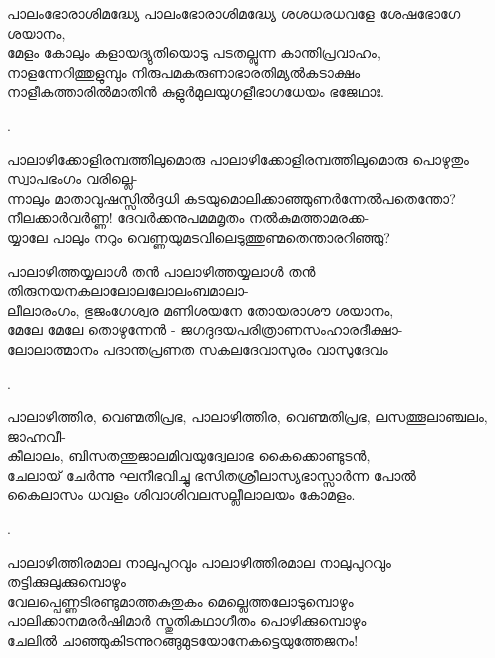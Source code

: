 \begin{enumerate}

\begin{slokam}{\VSr}{\Mazha}{പാലംഭോരാശിമദ്ധ്യേ}
 പാലംഭോരാശിമദ്ധ്യേ ശശധരധവളേ ശേഷഭോഗേ ശയാനം,\\
മേളം കോലും കളായദ്യുതിയൊടു പടതല്ലുന്ന കാന്തിപ്രവാഹം,\\
നാളന്നേറിത്തുളുമ്പും നിരുപമകരുണാഭാരതിമ്യൽകടാക്ഷം\\
നാളീകത്താരിൽമാതിൻ കുളുർമുലയുഗളീഭാഗധേയം ഭജേഥാഃ.
\end{slokam}


.


\begin{slokam}{\VSr}{\VKG}{പാലാഴിക്കോളിരമ്പത്തിലുമൊരു}
 പാലാഴിക്കോളിരമ്പത്തിലുമൊരു പൊഴുതും സ്വാപഭംഗം വരില്ലെ-\\
ന്നാലും മാതാവുഷസ്സിൽദ്ദധി കടയുമൊലിക്കാഞ്ഞുണർന്നേൽപതെന്തോ?\\
നീലക്കാർവർണ്ണ! ദേവർക്കനുപമമമൃതം നൽകുമത്താമരക്ക-\\
യ്യാലേ പാലും നറും വെണ്ണയുമടവിലെടുത്തുണ്മതെന്താരറിഞ്ഞു?
\end{slokam}


\begin{slokam}{\VSr}{\Punam}{പാലാഴിത്തയ്യലാള്‍ തൻ}
പാലാഴിത്തയ്യലാള്‍ തൻ തിരുനയനകലാലോലലോലംബമാലാ-\\
ലീലാരംഗം, ഭുജംഗേശ്വര മണിശയനേ തോയരാശൗ ശയാനം,\\
മേലേ മേലേ തൊഴുന്നേൻ - ജഗദുദയപരിത്രാണസംഹാരദീക്ഷാ-\\
ലോലാത്മാനം പദാന്തപ്രണത സകലദേവാസുരം വാസുദേവം
\end{slokam}


.

\begin{slokam}{\VSv}{\KJ}{പാലാഴിത്തിര, വെണ്മതിപ്രഭ,}
പാലാഴിത്തിര, വെണ്മതിപ്രഭ, ലസത്തൂലാഞ്ചലം, ജാഹ്നവീ-\\
കീലാലം, ബിസതന്തുജാലമിവയുദ്വേലാഭ കൈക്കൊണ്ടുടൻ, \\
ചേലായ് ചേർന്നു ഘനീഭവിച്ചു ഭസിതശ്രീലാസ്യഭാസ്സാർന്ന പോൽ \\
കൈലാസം ധവളം ശിവാശിവലസല്ലീലാലയം കോമളം.
\end{slokam}


. 

\begin{slokam}{\VSv}{\VKG}{പാലാഴിത്തിരമാല നാലുപുറവും}
പാലാഴിത്തിരമാല നാലുപുറവും തട്ടിക്കുലുക്കുമ്പൊഴും\\
വേലപ്പെണ്ണടിരണ്ടുമാത്തകുതുകം മെല്ലെത്തലോടുമ്പൊഴും\\
പാലിക്കാനമരർഷിമാർ സ്തുതികഥാഗീതം പൊഴിക്കുമ്പൊഴും\\
ചേലിൽ ചാഞ്ഞുകിടന്നുറങ്ങുമുടയോനേകട്ടെയുത്തേജനം!
\end{slokam}


\end{enumerate}
